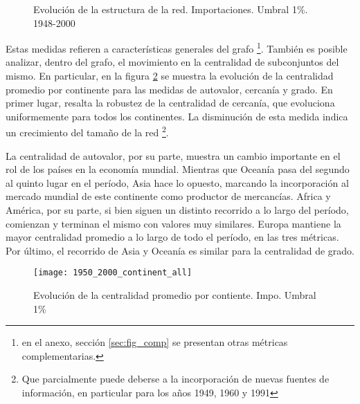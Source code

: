 \documentclass[class=article, crop=false]{standalone}
\begin{document}
\begin{figure}[h!]
	\centering
	\caption{Evolución de la estructura de la red. Importaciones. Umbral 1\%. 1948-2000}
	\label{fig:metricas_LP}
\end{figure}

Estas medidas refieren a características generales del grafo \footnote{en el anexo, sección \ref{sec:fig_comp} se presentan otras métricas complementarias.}. También es posible analizar, dentro del grafo, el movimiento en la centralidad de subconjuntos del mismo. En particular, en la figura  \ref{fig:centralidad_LP} se muestra la evolución de la centralidad promedio por continente para las medidas de autovalor, cercanía y grado. En primer lugar, resalta la robustez de la centralidad de cercanía, que evoluciona uniformemente para todos los continentes. La disminución de esta medida indica un crecimiento del tamaño de la red \footnote{ Que parcialmente puede deberse a la incorporación de nuevas fuentes de información, en particular para los años 1949, 1960 y 1991}. \par
La centralidad de autovalor, por su parte, muestra un cambio importante en el rol de los países en la economía mundial. Mientras que Oceanía pasa del segundo al quinto lugar en el período, Asia hace lo opuesto, marcando la incorporación al mercado mundial de este continente como productor de mercancías.  Africa y América, por su parte, si bien siguen un distinto recorrido a lo largo del período, comienzan y terminan el mismo con valores muy similares. Europa mantiene la mayor centralidad promedio a lo largo de todo el período, en las tres métricas. Por último, el recorrido de Asia y Oceanía es similar para la centralidad de grado.

\begin{figure}[h!]
	\centering		\texttt{[image: 1950\_2000\_continent\_all]}
	\caption{Evolución de la centralidad promedio por contiente. Impo. Umbral 1\%}
	\label{fig:centralidad_LP}
\end{figure}
\end{document}

